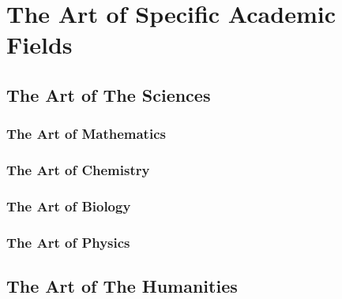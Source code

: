 \chapter{The Art of Specific Academic Fields}

\section{The Art of The Sciences}

\subsection{The Art of Mathematics}

\subsection{The Art of Chemistry}

\subsection{The Art of Biology}

\subsection{The Art of Physics}

\section{The Art of The Humanities}